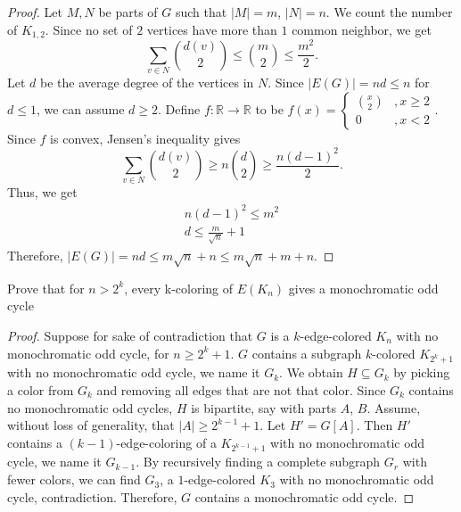 \documentclass{article}
\newenvironment{problem}[2][Question]{\begin{trivlist}
\item[\hskip \labelsep {\bfseries #1}\hskip \labelsep {\bfseries #2.}]}{\end{trivlist}}
\begin{document}
\begin{proof}
    Let $M, N$ be parts of $G$ such that $|M| = m$, $|N| = n$. We count the number of $K_{1,2}$. Since no set of $2$ vertices have more than $1$ common neighbor, we get
    \[
        \sum_{v \in N} { d(v) \choose 2 } \leq { m \choose 2 } \leq \frac{m^2}{2}.
    \]
    Let $d$ be the average degree of the vertices in $N$. Since $|E(G)| = nd \leq n$ for $d \leq 1$, we can assume $d \geq 2$. Define $f : \mathbb{R} \rightarrow \mathbb{R}$ to be $f(x) = \begin{cases}
        { x \choose 2 } &, x \geq 2 \\
        0 &, x < 2
    \end{cases}$. Since $f$ is convex, Jensen's inequality gives 
    \[
        \sum_{v \in N} { d(v) \choose 2 } \geq n{ d \choose 2 } \geq \frac{n(d - 1)^2}{2}.
    \]
    Thus, we get 
    \begin{gather}
        n(d - 1)^2 \leq m^2 \\
        d \leq \frac{m}{\sqrt{n}} + 1
    \end{gather}
    Therefore, $|E(G)| = nd \leq m\sqrt{n} + n \leq m\sqrt{n} + m + n$.
\end{proof}

\newpage

\begin{problem}{6.3.9}
    Prove that for $n > 2^k$, every k-coloring of $E(K_n)$ gives a monochromatic odd cycle
\end{problem}

\begin{proof}
    Suppose for sake of contradiction that $G$ is a $k$-edge-colored $K_n$ with no monochromatic odd cycle, for $n \geq 2^k + 1$. $G$ contains a subgraph $k$-colored $K_{2^k+1}$ with no monochromatic odd cycle, we name it $G_k$. We obtain $H \subseteq G_k$ by picking a color from $G_k$ and removing all edges that are not that color. Since $G_k$ contains no monochromatic odd cycles, $H$ is bipartite, say with parts $A$, $B$. Assume, without loss of generality, that $|A| \geq 2^{k-1} + 1$. Let $H' = G[A]$. Then $H'$ contains a $(k-1)$-edge-coloring of a $K_{2^{k-1} + 1}$ with no monochromatic odd cycle, we name it $G_{k-1}$. By recursively finding a complete subgraph $G_r$ with fewer colors, we can find $G_3$, a $1$-edge-colored $K_3$ with no monochromatic odd cycle, contradiction. Therefore, $G$ contains a monochromatic odd cycle.
\end{proof}
\end{document}
